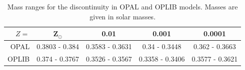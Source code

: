 %
%


\begin{table}
	\centering
	\begin{tabular}{r | c c c c}
		\hline
		$Z=$ & Z$_{\odot}$ & 0.01 & 0.001 & 0.0001 \\
		\hline
		\hline
		OPAL & 0.3803 - 0.384 & 0.3583 - 0.3631 & 0.34 - 0.3448 & 0.362 - 0.3663 \\
		OPLIB & 0.374 - 0.3767 & 0.3526 - 0.3567 & 0.3358 - 0.3406 & 0.3577 - 0.3621
	\end{tabular}
	\caption{Mass ranges for the discontinuity in OPAL and OPLIB models. Masses
	are given in solar masses.}
	\label{tab:fineMassRange}
\end{table}
